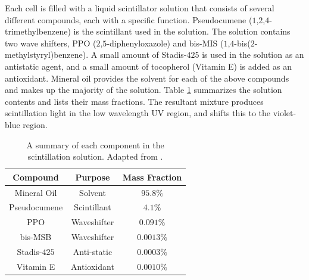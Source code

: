 Each cell is filled with a liquid scintillator solution that consists of several different compounds, each with a specific function. Pseudocumene ({$1$,$2$,$4$-trimethylbenzene}) is the scintillant used in the solution. The solution contains two wave shifters, PPO ($2$,$5$-diphenyloxazole) and bis-MIS ($1$,$4$-bis($2$-methylstyryl)\linebreak benzene). A small amount of Stadis-$425$ is used in the solution as an antistatic agent, and a small amount of tocopherol (Vitamin E) is added as an antioxidant. Mineral oil provides the solvent for each of the above compounds and makes up the majority of the solution. Table \ref{tab:scintillator} summarizes the solution contents and lists their mass fractions. The resultant mixture produces scintillation light in the low wavelength UV region, and shifts this to the violet-blue region.
\begin{table}[h]
  \begin{center}
    \begin{tabular}{c c c}
      \hline\hline
      Compound & Purpose & Mass Fraction \\
      \hline
      Mineral Oil & Solvent & $95.8\%$ \\
      Pseudocumene & Scintillant & $4.1\%$ \\
      PPO & Waveshifter & $0.091\%$ \\
      bis-MSB & Waveshifter & $0.0013\%$ \\
      Stadis-$425$ & Anti-static & $0.0003\%$ \\
      Vitamin E & Antioxidant & $0.0010\%$ \\
      \hline
    \end{tabular}
    \caption[Scintillator Solution Summary]{A summary of each component in the scintillation solution. Adapted from \cite{ref:TDRNOvA}.}
    \label{tab:scintillator}
  \end{center}
\end{table}

